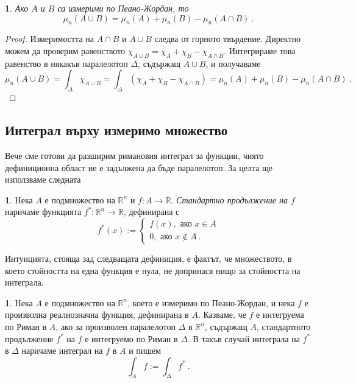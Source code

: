 \documentclass[11pt]{article}
\numberwithin{equation}{section}
\numberwithin{figure}{section}
\numberwithin{table}{section}
\theoremstyle{plain}
\theoremstyle{definition}
\newtheorem{defn}[thm]{\protect\definitionname}
\theoremstyle{remark}
\theoremstyle{definition}
\theoremstyle{remark}
\theoremstyle{plain}
\theoremstyle{definition}
\theoremstyle{definition}
\theoremstyle{plain}
\newtheorem{cor}[thm]{\protect\corollaryname}
\theoremstyle{plain}
\theoremstyle{plain}
\theoremstyle{definition}
\theoremstyle{plain}
\providecommand{\corollaryname}{Следствие}
\providecommand{\definitionname}{Дефиниция}
\newcommand*{\R}{\mathbb{R}}
\begin{document}
\begin{cor}
Ако $A$ и $B$ са измерими по Пеано-Жордан, то $$\mu_n(A\cup B)=\mu_n(A) + \mu_n(B)- \mu_n(A\cap B)\ .$$
\end{cor}

\begin{proof}
Измеримостта на $A \cap B$ и $A\cup B$ следва от горното твърдение. Директно можем да проверим равенството $\chi_{A\cup B}=\chi_A +\chi_B-\chi_{A\cap B}$. Интегрираме това равенство в някакъв паралелотоп $\Delta$, съдържащ $A\cup B$, и получаваме
$$\mu_n(A\cup B)=\int_{\Delta} \chi_{A\cup B} = \int_{\Delta}(\chi_A +\chi_B-\chi_{A\cap B}) = \mu_n(A)+\mu_n(B)-\mu_n(A\cap B) \ .$$
\end{proof}

\subsection{Интеграл върху измеримо множество}

Вече сме готови да разширим римановия интеграл за функции, чиято дефиниционна област не е задължена да бъде паралелотоп. За целта ще използваме следната

\begin{defn}
Нека $A$ е подмножество на $\R^n$ и $f:A\longrightarrow \R$. \textit{Стандартно продължение на $f$} наричаме функцията $f^*:\R^n\longrightarrow \R$, дефинирана с
$$f^* (x):=\left\{ \begin{array}{l} f(x), \mbox{ ако } x\in A \\ 0, \mbox{ ако } x\not \in A \ .\end{array}\right.$$
\end{defn}

Интуицията, стояща зад следващата дефиниция, е фактът, че множеството, в което стойността на една функция е нула, не допринася нищо за стойността на интеграла.

\begin{defn}
Нека $A$ е подмножество на $\R^n$, което е измеримо по Пеано-Жордан, и нека $f$ е произволна реалнозначна функция, дефинирана в $A$. Казваме, че $f$ е интегруема по Риман в $A$, ако за произволен паралелотоп $\Delta$ в $\R^n$, съдържащ $A$, стандартното продължение $f^*$ на $f$ е интегруемо по Риман в $\Delta$. В такъв случай интеграла на $f^*$ в $\Delta$ наричаме интеграл на $f$ в $A$ и пишем
$$\int_A f :=\int_\Delta f^* \ .$$
\end{defn}
\end{document}
